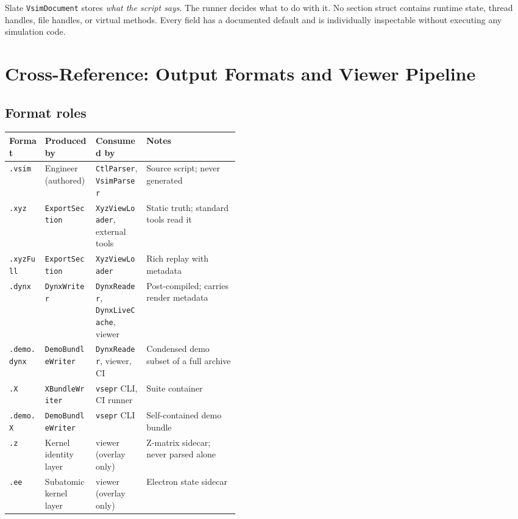 ﻿\documentclass[11pt,a4paper]{article}
\begin{document}
\begin{notebox}{Slate}
\texttt{VsimDocument} stores \emph{what the script says}.
The runner decides what to do with it.
No section struct contains runtime state, thread handles, file handles, or virtual
methods.  Every field has a documented default and is individually inspectable
without executing any simulation code.
\end{notebox}

\newpage
\section{Cross-Reference: Output Formats and Viewer Pipeline}
\label{sec:xref}

\subsection*{Format roles}

\begin{center}
\begin{tabularx}{\linewidth}{@{}lp{0.22\linewidth}p{0.22\linewidth}X@{}}
\toprule
\textbf{Format} & \textbf{Produced by} & \textbf{Consumed by} & \textbf{Notes} \\
\midrule
\texttt{.vsim}      & Engineer (authored)      & \texttt{CtlParser}, \texttt{VsimParser} & Source script; never generated \\
\texttt{.xyz}       & \texttt{ExportSection}   & \texttt{XyzViewLoader}, external tools & Static truth; standard tools read it \\
\texttt{.xyzFull}   & \texttt{ExportSection}   & \texttt{XyzViewLoader}                 & Rich replay with metadata \\
\texttt{.dynx}      & \texttt{DynxWriter}      & \texttt{DynxReader}, \texttt{DynxLiveCache}, viewer & Post-compiled; carries render metadata \\
\texttt{.demo.dynx} & \texttt{DemoBundleWriter}& \texttt{DynxReader}, viewer, CI       & Condensed demo subset of a full archive \\
\texttt{.X}         & \texttt{XBundleWriter}   & \texttt{vsepr} CLI, CI runner         & Suite container \\
\texttt{.demo.X}    & \texttt{DemoBundleWriter}& \texttt{vsepr} CLI                    & Self-contained demo bundle \\
\texttt{.z}         & Kernel identity layer    & viewer (overlay only)                 & Z-matrix sidecar; never parsed alone \\
\texttt{.ee}        & Subatomic kernel layer   & viewer (overlay only)                 & Electron state sidecar \\
\bottomrule
\end{tabularx}
\end{center}
\end{document}
